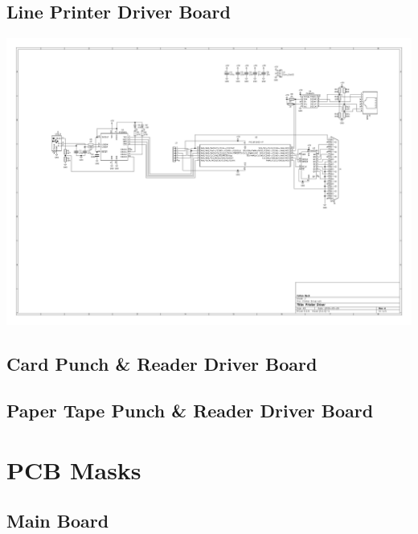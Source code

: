 \documentclass{book}
\begin{document}
\section{Line Printer Driver Board}
\begin{sideways}
\centering
\includegraphics[height=1.1\textwidth]{../Board_Layouts/Printer_Driver/Printer_Driver.pdf}
\end{sideways}
\clearpage

\section{Card Punch \& Reader Driver Board}
\clearpage

\section{Paper Tape Punch \& Reader Driver Board}

\chapter{PCB Masks}
\section{Main Board}
\clearpage
\end{document}
